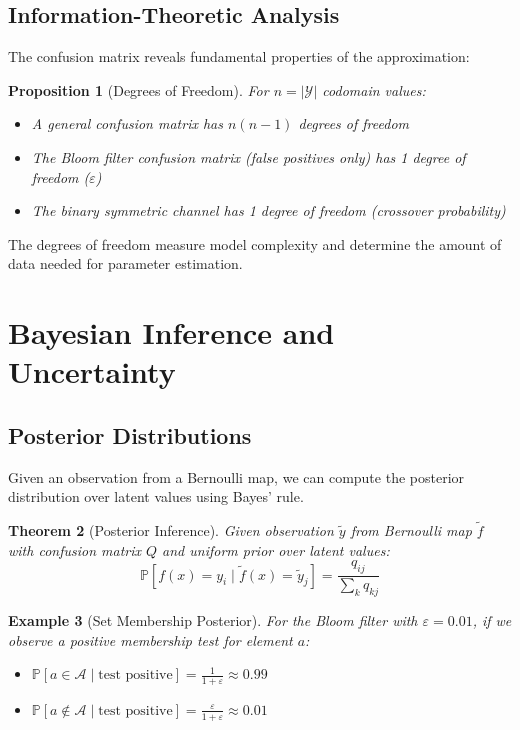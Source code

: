 \documentclass[11pt]{article}
\newtheorem{theorem}{Theorem}
\newtheorem{proposition}[theorem]{Proposition}
\newtheorem{example}[theorem]{Example}
\newcommand{\calY}{\mathcal{Y}}
\newcommand{\calA}{\mathcal{A}}
\newcommand{\eps}{\varepsilon}
\renewcommand{\Pr}{\mathbb{P}}
\begin{document}
\subsection{Information-Theoretic Analysis}

The confusion matrix reveals fundamental properties of the approximation:

\begin{proposition}[Degrees of Freedom]
For $n = |\calY|$ codomain values:
\begin{itemize}
\item A general confusion matrix has $n(n-1)$ degrees of freedom
\item The Bloom filter confusion matrix (false positives only) has 1 degree of freedom ($\eps$)
\item The binary symmetric channel has 1 degree of freedom (crossover probability)
\end{itemize}
\end{proposition}

The degrees of freedom measure model complexity and determine the amount of data needed for parameter estimation.

\section{Bayesian Inference and Uncertainty}

\subsection{Posterior Distributions}

Given an observation from a Bernoulli map, we can compute the posterior distribution over latent values using Bayes' rule.

\begin{theorem}[Posterior Inference]
Given observation $\tilde{y}$ from Bernoulli map $\tilde{f}$ with confusion matrix $Q$ and uniform prior over latent values:
\[
\Pr[f(x) = y_i \mid \tilde{f}(x) = \tilde{y}_j] = \frac{q_{ij}}{\sum_{k} q_{kj}}
\]
\end{theorem}

\begin{example}[Set Membership Posterior]
For the Bloom filter with $\eps = 0.01$, if we observe a positive membership test for element $a$:
\begin{itemize}
\item $\Pr[a \in \calA \mid \text{test positive}] = \frac{1}{1+\eps} \approx 0.99$
\item $\Pr[a \notin \calA \mid \text{test positive}] = \frac{\eps}{1+\eps} \approx 0.01$
\end{itemize}
\end{example}
\end{document}

